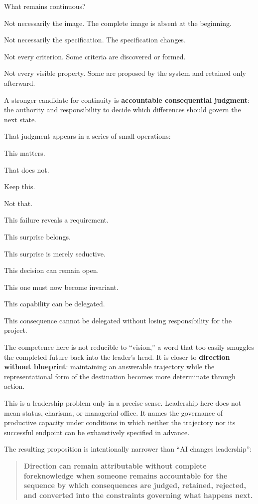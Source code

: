 \documentclass[
  11pt,
  letterpaper,
]{article}
\begin{document}
What remains continuous?

Not necessarily the image. The complete image is absent at the
beginning.

Not necessarily the specification. The specification changes.

Not every criterion. Some criteria are discovered or formed.

Not every visible property. Some are proposed by the system and retained
only afterward.

A stronger candidate for continuity is \textbf{accountable consequential
judgment}: the authority and responsibility to decide which differences
should govern the next state.

That judgment appears in a series of small operations:

This matters.

That does not.

Keep this.

Not that.

This failure reveals a requirement.

This surprise belongs.

This surprise is merely seductive.

This decision can remain open.

This one must now become invariant.

This capability can be delegated.

This consequence cannot be delegated without losing responsibility for
the project.

The competence here is not reducible to ``vision,'' a word that too
easily smuggles the completed future back into the leader's head. It is
closer to \textbf{direction without blueprint}: maintaining an
answerable trajectory while the representational form of the destination
becomes more determinate through action.

This is a leadership problem only in a precise sense. Leadership here
does not mean status, charisma, or managerial office. It names the
governance of productive capacity under conditions in which neither the
trajectory nor its successful endpoint can be exhaustively specified in
advance.

The resulting proposition is intentionally narrower than ``AI changes
leadership'':

\begin{quote}
\textbf{Direction can remain attributable without complete foreknowledge
when someone remains accountable for the sequence by which consequences
are judged, retained, rejected, and converted into the constraints
governing what happens next.}
\end{quote}
\end{document}
